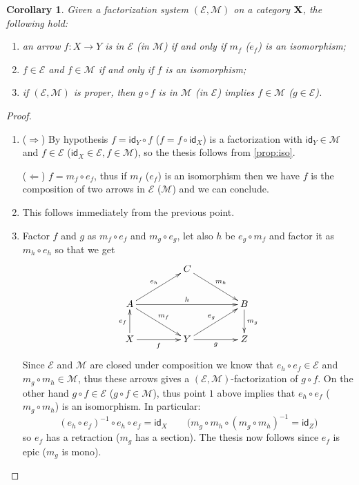 \documentclass[a4paper]{article}
\newcommand{\id}[1]{\mathsf{id}_{#1}}
\def\X{\textbf {\textup{X}}}
\newtheorem{corollary}[theorem]{Corollary}
\theoremstyle{definition}
\begin{document}
\begin{corollary}\label{cor:iso} Given a factorization system $(\mathcal{E}, \mathcal{M})$ on a category $\X$, the following hold:
	\begin{enumerate}
		\item an arrow $f\colon X\to Y$ is in $\mathcal{E}$ (in $\mathcal{M}$) if and only if $m_f$ ($e_f$) is an isomorphism;
		\item $f\in \mathcal{E}$ and $f\in \mathcal{M}$ if and only if $f$ is an isomorphism;
		\item  if $(\mathcal{E}, \mathcal{M})$ is proper, then $g\circ f$ is in $\mathcal{M}$ (in $\mathcal{E}$) implies $f\in \mathcal{M}$ ($g\in \mathcal{E}$).
	\end{enumerate}
\end{corollary}
\begin{proof}
	\begin{enumerate}
		\item  ($\Rightarrow$) By hypothesis $f=\id{Y}\circ f$ ($f=f\circ \id{X}$) is a factorization with $\id{Y}\in \mathcal{M}$ and $f\in \mathcal{E}$ ($\id{X}\in \mathcal{E}, f\in \mathcal{M}$), so the thesis follows from \cref{prop:iso}.
		
		\smallskip \noindent
		($\Leftarrow$) $f=m_f\circ e_f$, thus if $m_f$ ($e_f$) is an isomorphism then we have $f$ is the composition of two arrows in $\mathcal{E}$ ($\mathcal{M}$) and we can conclude.
		
		\item This follows immediately from the previous point.
		
		\item 
		Factor $f$ and $g$ as $m_f\circ e_f$ and $m_g\circ e_g$, let also $h$ be $e_g\circ m_f$ and factor it as $m_h\circ e_h$ so that we get 
		\[\xymatrix@C=45pt{& C \ar[dr]^{m_h}&\\
			A\ar[ur]^{e_h} \ar[rr]^{h}  \ar[dr]^{m_f}& &B \ar[d]^{m_g}\\
			X \ar[u]^{e_f} \ar[r]_f& Y \ar[r]_g \ar[ur]^{e_g} & Z}\]
		Since $\mathcal{E}$ and $\mathcal{M}$ are closed under composition we know that $e_h\circ e_f\in \mathcal{E}$ and $m_g \circ m_h\in \mathcal{M}$, thus  these arrows gives a $(\mathcal{E}, \mathcal{M})$-factorization of $g\circ f$. On the other hand $g\circ f\in \mathcal{E}$ ($g\circ f\in \mathcal{M}$), thus point $1$ above  implies that  $e_h\circ e_f$ ($m_g\circ m_h$) is an isomorphism. In particular:
		\[(e_h\circ e_f)^{-1}\circ e_h \circ e_f =\id{X} \qquad \text{(}m_g\circ m_h \circ (m_g\circ m_h)^{-1}=\id{Z}\text{)}  \]
		so $e_f$ has a retraction ($m_g$ has a section). The thesis now follows since $e_f$ is epic ($m_g$ is mono). \qedhere 
	\end{enumerate}
\end{proof}
\end{document}

